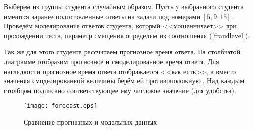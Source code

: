 Выберем из группы студента случайным образом. Пусть у выбранного студента имеются заранее подготовленные ответы на задачи под номерами $[5,9,15]$. Проведём моделирование ответов студента, который <<мошенничает>> при прохождении теста, параметр смещения определим из соотношения (\ref{fraudlevel}).

Так же для этого студента рассчитаем прогнозное время ответа. На стол\-бчатой диаграмме отобразим прогнозное и смоделированное время ответа. Для наглядности прогнозное время ответа отображается <<как есть>>, а вместо значения смоделированной величины берём ей противоположную . Над каж\-дым столбцом подписано соответствующее ему числовое значение (для удоб\-ства).

\begin{figure}[ht!]
\centering \texttt{[image: forecast.eps]}
\caption{Сравнение прогнозных и модельных данных}
\end{figure}